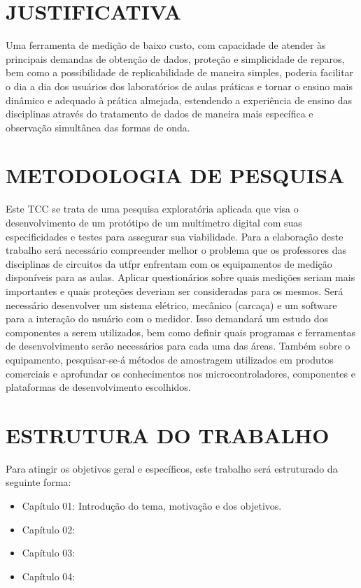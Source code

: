 \section{JUSTIFICATIVA}\label{sec:justificativa}
Uma ferramenta de medição de baixo custo, com capacidade de atender às principais demandas de obtenção de dados, proteção e simplicidade de reparos, bem como a possibilidade de replicabilidade de maneira simples, poderia facilitar o dia a dia dos usuários dos laboratórios de aulas práticas e tornar o ensino mais dinâmico e adequado à prática almejada, estendendo a experiência de ensino das disciplinas através do tratamento de dados de maneira mais específica e observação simultânea das formas de onda.

\section{METODOLOGIA DE PESQUISA}\label{sec:metodologiapesq}
Este \gls{TCC} se trata de uma pesquisa exploratória aplicada que visa o desenvolvimento de um protótipo de um multímetro digital com suas especificidades e testes para assegurar sua viabilidade. 
Para a elaboração deste trabalho será necessário compreender melhor o problema que os professores das disciplinas de circuitos da \gls{utfpr} enfrentam com os equipamentos de medição disponíveis para as aulas. Aplicar questionários sobre quais medições seriam mais importantes e quais proteções deveriam ser consideradas para os mesmos.
Será necessário desenvolver um sistema elétrico, mecânico (carcaça) e um software para a interação do usuário com o medidor. Isso demandará um estudo dos componentes a serem utilizados, bem como definir quais programas e ferramentas de desenvolvimento serão necessários para cada uma das áreas.
Também sobre o equipamento, pesquisar-se-á métodos de amostragem utilizados em produtos comerciais e aprofundar os conhecimentos nos microcontroladores, componentes e plataformas de desenvolvimento escolhidos.

\section{ESTRUTURA DO TRABALHO}\label{sec:estruturatrab}

Para atingir os objetivos geral e específicos, este trabalho será estruturado da seguinte forma:

\begin{itemize}
    \item Capítulo 01: Introdução do tema, motivação e dos objetivos.
    \item Capítulo 02:
    \item Capítulo 03:
    \item Capítulo 04:
\end{itemize}

